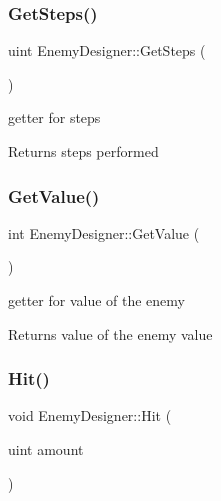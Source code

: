\mbox{\label{class_enemy_designer_a4a1fc18b37685368194461f744937d22}} 
\subsubsection{\texorpdfstring{Get\+Steps()}{GetSteps()}}
{\footnotesize\ttfamily uint Enemy\+Designer\+::\+Get\+Steps (\begin{DoxyParamCaption}{ }\end{DoxyParamCaption})}



getter for steps 

\begin{DoxyReturn}{Returns}
steps performed 
\end{DoxyReturn}
\mbox{\label{class_enemy_designer_aa1982407303eb55be476281c5b7a40f8}} 
\subsubsection{\texorpdfstring{Get\+Value()}{GetValue()}}
{\footnotesize\ttfamily int Enemy\+Designer\+::\+Get\+Value (\begin{DoxyParamCaption}{ }\end{DoxyParamCaption})}



getter for value of the enemy 

\begin{DoxyReturn}{Returns}
value of the enemy value 
\end{DoxyReturn}
\mbox{\label{class_enemy_designer_a6aac3b8c8fa145212a1d37a1f1bcaca7}} 
\subsubsection{\texorpdfstring{Hit()}{Hit()}}
{\footnotesize\ttfamily void Enemy\+Designer\+::\+Hit (\begin{DoxyParamCaption}\item[{uint}]{amount }\end{DoxyParamCaption})}



